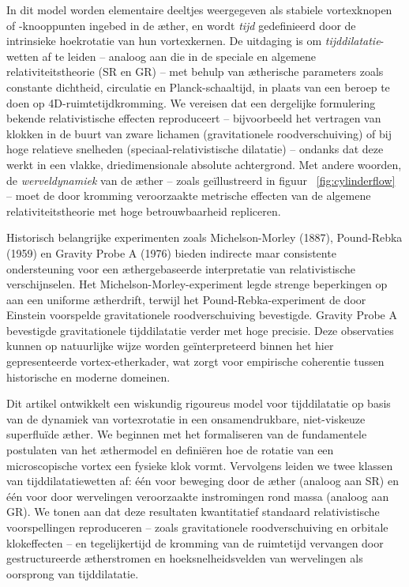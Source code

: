 In dit model worden elementaire deeltjes weergegeven als stabiele vortexknopen of -knooppunten ingebed in de æther, en wordt \emph{tijd} gedefinieerd door de intrinsieke hoekrotatie van hun vortexkernen. De uitdaging is om \emph{tijddilatatie}-wetten af te leiden – analoog aan die in de speciale en algemene relativiteitstheorie (SR en GR) – met behulp van ætherische parameters zoals constante dichtheid, circulatie en Planck-schaaltijd, in plaats van een beroep te doen op 4D-ruimtetijdkromming. We vereisen dat een dergelijke formulering bekende relativistische effecten reproduceert – bijvoorbeeld het vertragen van klokken in de buurt van zware lichamen (gravitationele roodverschuiving) of bij hoge relatieve snelheden (speciaal-relativistische dilatatie) – ondanks dat deze werkt in een vlakke, driedimensionale absolute achtergrond. Met andere woorden, de \emph{werveldynamiek} van de æther – zoals geïllustreerd in figuur ~\ref{fig:cylinderflow} – moet de door kromming veroorzaakte metrische effecten van de algemene relativiteitstheorie met hoge betrouwbaarheid repliceren.

Historisch belangrijke experimenten zoals Michelson-Morley (1887), Pound-Rebka (1959) en Gravity Probe A (1976) bieden indirecte maar consistente ondersteuning voor een æthergebaseerde interpretatie van relativistische verschijnselen. Het Michelson-Morley-experiment legde strenge beperkingen op aan een uniforme ætherdrift, terwijl het Pound-Rebka-experiment de door Einstein voorspelde gravitationele roodverschuiving bevestigde. Gravity Probe A bevestigde gravitationele tijddilatatie verder met hoge precisie. Deze observaties kunnen op natuurlijke wijze worden geïnterpreteerd binnen het hier gepresenteerde vortex-etherkader, wat zorgt voor empirische coherentie tussen historische en moderne domeinen.

Dit artikel ontwikkelt een wiskundig rigoureus model voor tijddilatatie op basis van de dynamiek van vortexrotatie in een onsamendrukbare, niet-viskeuze superfluïde æther. We beginnen met het formaliseren van de fundamentele postulaten van het æthermodel en definiëren hoe de rotatie van een microscopische vortex een fysieke klok vormt. Vervolgens leiden we twee klassen van tijddilatatiewetten af: één voor beweging door de æther (analoog aan SR) en één voor door wervelingen veroorzaakte instromingen rond massa (analoog aan GR). We tonen aan dat deze resultaten kwantitatief standaard relativistische voorspellingen reproduceren – zoals gravitationele roodverschuiving en orbitale klokeffecten – en tegelijkertijd de kromming van de ruimtetijd vervangen door gestructureerde ætherstromen en hoeksnelheidsvelden van wervelingen als oorsprong van tijddilatatie.